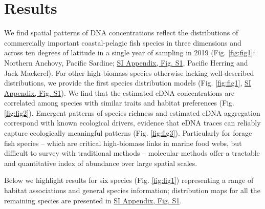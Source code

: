 \documentclass{article}
\begin{document}
\section*{Results}
We find spatial patterns of DNA concentrations reflect the distributions of commercially important coastal-pelagic fish species in three dimensions and across ten degrees of latitude in a single year of sampling in 2019 (Fig. \ref{fig:fig1}: Northern Anchovy, Pacific Sardine; \href{SI_Appendix.pdf}{SI Appendix, Fig. S1}, Pacific Herring and Jack Mackerel). For other high-biomass species otherwise lacking well-described distributions, we provide the first species distribution models (Fig. \ref{fig:fig1}, \href{SI_Appendix.pdf}{SI Appendix, Fig. S1}). We find that the estimated eDNA concentrations are correlated among species with similar traits and habitat preferences (Fig. \ref{fig:fig2}). Emergent patterns of species richness and estimated eDNA aggregation correspond with known ecological drivers, evidence that eDNA traces can reliably capture ecologically meaningful patterns (Fig. \ref{fig:fig3}). Particularly for forage fish species – which are critical high-biomass links in marine food webs, but difficult to survey with traditional methods \cite{Pikitch2012} – molecular methods offer a tractable and quantitative index of abundance over large spatial scales.

Below we highlight results for six species (Fig. \ref{fig:fig1}) representing a range of habitat associations and general species information; distribution maps for all the remaining species are presented in \href{SI_Appendix.pdf}{SI Appendix, Fig. S1}.
\end{document}
